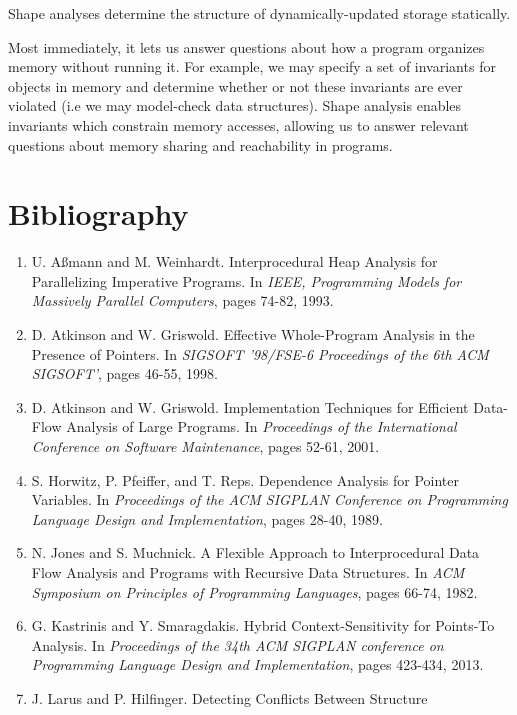 \documentclass{article}
\begin{document}
Shape analyses determine the structure of dynamically-updated storage
statically.

Most immediately, it lets us answer questions about how a program organizes
memory without running it. For example, we may specify a set of invariants
for objects in memory and determine whether or not these invariants are ever
violated (i.e we may model-check data structures). Shape analysis enables
invariants which constrain memory accesses, allowing us to answer relevant
questions about memory sharing and reachability in programs.

\section{Bibliography}

\begin{enumerate}[1.]
    \item U. A{\ss}mann and M. Weinhardt. Interprocedural Heap Analysis for
        Parallelizing Imperative Programs. In \textit{IEEE, Programming
        Models for Massively Parallel Computers}, pages 74-82, 1993.
    \item D. Atkinson and W. Griswold. Effective Whole-Program Analysis in
        the Presence of Pointers. In \textit{SIGSOFT '98/FSE-6 Proceedings
        of the 6th ACM SIGSOFT'}, pages 46-55, 1998.
    \item D. Atkinson and W. Griswold. Implementation Techniques for
        Efficient Data-Flow Analysis of Large Programs. In
        \textit{Proceedings of the International Conference on Software
        Maintenance}, pages 52-61, 2001.
    \item S. Horwitz, P. Pfeiffer, and T. Reps. Dependence Analysis for
        Pointer Variables. In \textit{Proceedings of the ACM SIGPLAN 
        Conference on Programming Language Design and Implementation}, pages
        28-40, 1989.
    \item N. Jones and S. Muchnick. A Flexible Approach to Interprocedural
        Data Flow Analysis and Programs with Recursive Data Structures. In
        \textit{ACM Symposium on Principles of Programming Languages}, pages
        66-74, 1982.
    \item G. Kastrinis and Y. Smaragdakis. Hybrid Context-Sensitivity for
        Points-To Analysis. In \textit{Proceedings of the 34th ACM SIGPLAN
        conference on Programming Language Design and Implementation}, pages
        423-434, 2013.
    \item J. Larus and P. Hilfinger. Detecting Conflicts Between Structure

\end{enumerate}
\end{document}

